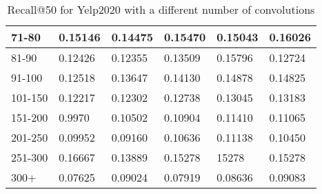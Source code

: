 \begin{table*}[]
\begin{tabular}{|l|l|l|l|l|l|}
    71-80     & 0.15146                    & 0.14475                    & 0.15470                    & 0.15043                    & 0.16026                   \\ \hline
    81-90     & 0.12426                    & 0.12355                    & 0.13509                    & 0.15796                    & 0.12724                    \\ \hline
    91-100    & 0.12518                    & 0.13647                    & 0.14130                    & 0.14878                    & 0.14825                    \\ \hline
    101-150   & 0.12217                    & 0.12302                    & 0.12738                    & 0.13045                    & 0.13183                    \\ \hline
    151-200   & 0.9970                     & 0.10502                    & 0.10904                    & 0.11410                    & 0.11065                    \\ \hline
    201-250   & 0.09952                    & 0.09160                    & 0.10636                    & 0.11138                    & 0.10450                    \\ \hline
    251-300   & 0.16667                    & 0.13889                    & 0.15278                    & 15278                      & 0.15278                    \\ \hline
    300+      & 0.07625                    & 0.09024                    & 0.07919                    & 0.08636                    & 0.09083                           \\ \hline
    \end{tabular}
    \caption{Recall@50 for Yelp2020 with a different number of convolutions}
    \label{tab:Yelp2020-recall-evaluation-mean}
\end{table*}

